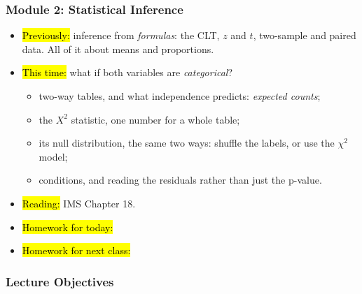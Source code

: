

\begin{frame}
\frametitle{Module 2: Statistical Inference}
    \begin{itemize}
        \item \hl{Previously:} inference from \emph{formulas}: the CLT, $z$ and $t$, two-sample and paired data. All of it about means and proportions.
        \item \hl{This time:} what if both variables are \emph{categorical}?
          \begin{itemize}
              \item two-way tables, and what independence predicts: \emph{expected counts};
              \item the $X^2$ statistic, one number for a whole table;
              \item its null distribution, the same two ways: shuffle the labels, or use the $\chi^2$ model;
              \item conditions, and reading the residuals rather than just the p-value.
          \end{itemize}
        \item \hl{Reading:} IMS Chapter 18.
        \item \hl{Homework for today:}
        \item \hl{Homework for next class:}
    \end{itemize}
\end{frame}


\begin{frame}
    \frametitle{Lecture Objectives}
\end{frame}
